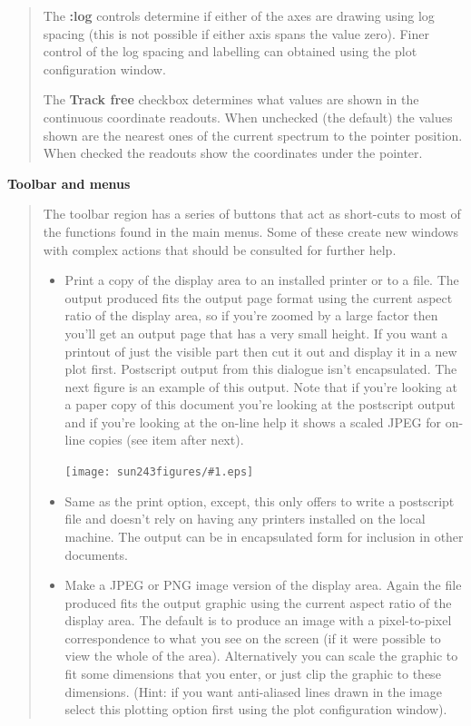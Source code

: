 \documentclass[twoside,11pt]{article}
\newcommand{\htmladdimg}[1]{}
\newcommand{\latexhtml}[2]{#1}
\renewcommand{\_}{\texttt{\symbol{95}}}
\newcommand{\clippedmainfigure}[1]
{\begin{center}
 \latexhtml{\texttt{[image: sun243\_figures/\#1.eps]}}{\htmladdimg{#1.gif}}
 \end{center}
}
\newcommand{\inline}[1]
        {\latexhtml{\texttt{[image: sun243\_figures/\#1.eps]}}
        {\htmladdimg[align=center]{#1.gif}}}
\newcommand{\labelitem}[1]{\textbf{#1}}
\newcommand{\subheading}[1]{\textbf{\large{#1}}}
\begin{document}
\begin{quote}
 The \labelitem{:log} controls determine if either of the axes are drawing
 using log spacing (this is not possible if either axis spans the value
 zero). Finer control of the log spacing and labelling can obtained using the
 plot configuration window.

 The \labelitem{Track free} checkbox determines what values are shown in the
 continuous coordinate readouts. When unchecked (the default) the values
 shown are the nearest ones of the current spectrum to the pointer position.
 When checked the readouts show the coordinates under the pointer.

\end{quote}

\subheading{Toolbar and menus}
\begin{quote}
 The toolbar region has a series of buttons that act as short-cuts to
 most of the functions found in the main menus. Some of these create
 new windows with complex actions that should be consulted for further
 help.

 \begin{itemize}

  \item[\inline{print}] Print a copy of the display area to an installed
  printer or to a file. The output produced fits the output page format using
  the current aspect ratio of the display area, so if you're zoomed by a large
  factor then you'll get an output page that has a very small height. If you
  want a printout of just the visible part then cut it out and display it in a
  new plot first. Postscript output from this dialogue isn't encapsulated.
  The next figure is an example of this output. Note that if you're looking at
  a paper copy of this document you're looking at the postscript output and if
  you're looking at the on-line help it shows a scaled JPEG for on-line copies
  (see item after next).

  \clippedmainfigure{printoutput}

  \item[\inline{postscriptprint}] Same as the print option, except, this only
  offers to write a postscript file and doesn't rely on having any printers
  installed on the local machine. The output can be in encapsulated form
  for inclusion in other documents.

  \item[\inline{jpegpng}] Make a JPEG or PNG image version of the display
  area. Again the file produced fits the output graphic using the current
  aspect ratio of the display area. The default is to produce an image
  with a pixel-to-pixel correspondence to what you see on the screen
  (if it were possible to view the whole of the area). Alternatively you
  can scale the graphic to fit some dimensions that you enter, or just
  clip the graphic to these dimensions. (Hint: if you want anti-aliased
  lines drawn in the image select this plotting option first using the plot
  configuration window).


\end{itemize}
\end{quote}
\end{document}
